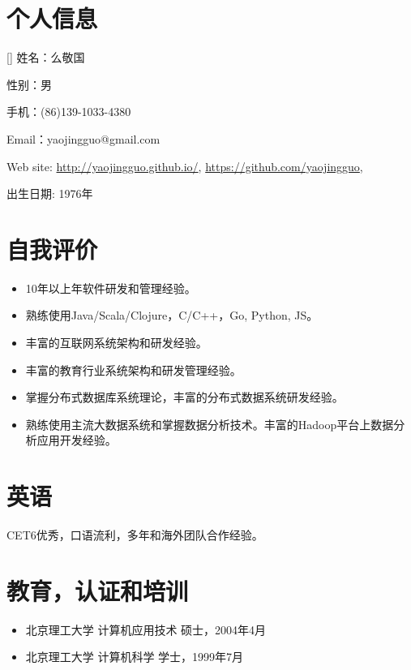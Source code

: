 \documentclass[a4paper]{article}
\newenvironment{DUlineblock}[1]{%
    \list{}{\setlength{\partopsep}{\parskip}
            \addtolength{\partopsep}{\baselineskip}
            \setlength{\topsep}{0pt}
            \setlength{\itemsep}{0.15\baselineskip}
            \setlength{\parsep}{0pt}
            \setlength{\leftmargin}{#1}}
    \raggedright
  }
  {\endlist}
\begin{document}
\begin{CJK}{UTF8}{gkai}

\section*{个人信息}

\begin{DUlineblock}{0em}
\item[] 姓名：么敬国
\item[] 性别：男
\item[] 手机：(86)139-1033-4380
\item[] Email：yaojingguo@gmail.com
\item[] Web site: \url{http://yaojingguo.github.io/},
\url{https://github.com/yaojingguo},
\item[] 出生日期: 1976年
\end{DUlineblock}


\section*{自我评价}
\begin{itemize}
\item 10年以上年软件研发和管理经验。
\item 熟练使用Java/Scala/Clojure，C/C++，Go, Python, JS。
\item 丰富的互联网系统架构和研发经验。
\item 丰富的教育行业系统架构和研发管理经验。
\item 掌握分布式数据库系统理论，丰富的分布式数据系统研发经验。
\item 熟练使用主流大数据系统和掌握数据分析技术。丰富的Hadoop平台上数据分析应用开发经验。
\end{itemize}

\section*{英语}
CET6优秀，口语流利，多年和海外团队合作经验。

\section*{教育，认证和培训}
\begin{itemize}
\item 北京理工大学       计算机应用技术            硕士，2004年4月
\item 北京理工大学       计算机科学                学士，1999年7月
\end{itemize}


\end{CJK}
\end{document}
